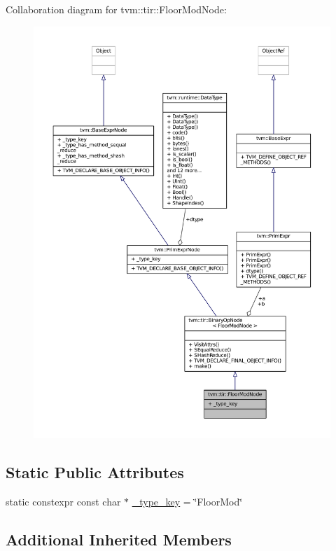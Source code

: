 Collaboration diagram for tvm\+:\+:tir\+:\+:Floor\+Mod\+Node\+:
\nopagebreak
\begin{figure}[H]
\begin{center}
\leavevmode
\includegraphics[width=350pt]{classtvm_1_1tir_1_1FloorModNode__coll__graph}
\end{center}
\end{figure}
\subsection*{Static Public Attributes}
\begin{DoxyCompactItemize}
\item 
static constexpr const char $\ast$ \hyperlink{classtvm_1_1tir_1_1FloorModNode_a4357e6358dadc500972c4b8520bcc8df}{\+\_\+type\+\_\+key} = \char`\"{}Floor\+Mod\char`\"{}
\end{DoxyCompactItemize}
\subsection*{Additional Inherited Members}



